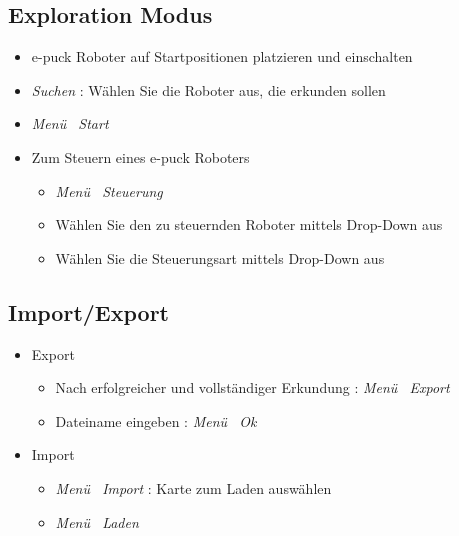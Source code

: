 \documentclass[10pt,a4paper]{article}
\begin{document}
	\subsection{Exploration Modus}
		\begin{itemize}
			\item{e-puck Roboter auf Startpositionen platzieren und einschalten}
			\item{\textit{Suchen} : W\"ahlen Sie die Roboter aus, die erkunden sollen}			
			\item{\textit{Men\"u \frq \frq \ Start}}
			\item{Zum Steuern eines e-puck Roboters}
			\begin{itemize}
				\item{\textit{Men\"u \frq \frq \ Steuerung}}
				\item{W\"ahlen Sie den zu steuernden Roboter mittels Drop-Down aus}
				\item{W\"ahlen Sie die Steuerungsart mittels Drop-Down aus}
			\end{itemize}
		\end{itemize}
	\subsection{Import/Export}
		\begin{itemize}
			\item{Export}
				\begin{itemize}
					\item{Nach erfolgreicher und vollst\"andiger Erkundung : \textit{Men\"u \frq \frq \ Export}}
					\item{Dateiname eingeben : \textit{Men\"u \frq \frq \ Ok}}
				\end{itemize}
			\item{Import}			
				\begin{itemize}
					\item{\textit{Men\"u \frq \frq \ Import} : Karte zum Laden ausw\"ahlen}
					\item{\textit{Men\"u \frq \frq \ Laden}}
				\end{itemize}
		\end{itemize}
\end{document}
